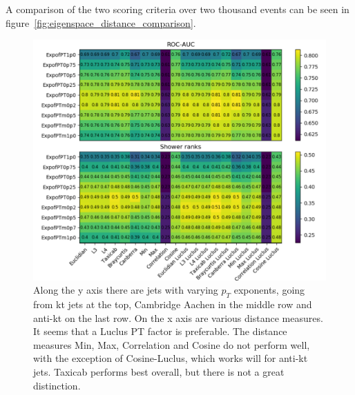 A comparison of the two scoring criteria over two thousand events can be seen in figure~\ref{fig:eigenspace_distance_comparison}.
\begin{figure}[htp]
    \includegraphics[width=1.\textwidth]{graphics/physspace_distance_comparison}
    \caption{
            Along the y axis there are jets with varying \(p_T\) exponents, going
            from kt jets at the top, Cambridge Aachen in the middle row and anti-kt
            on the last row.
            On the x axis are various distance measures.
            It seems that a Luclus PT factor is preferable.
            The distance measures Min, Max, Correlation and Cosine
            do not perform well, with the exception of
            Cosine-Luclus, which works will for anti-kt jets.
            Taxicab performs best overall, but there is not
            a great distinction.
             }\label{fig:physspace_distance_comparison}
\end{figure}    

\FloatBarrier
